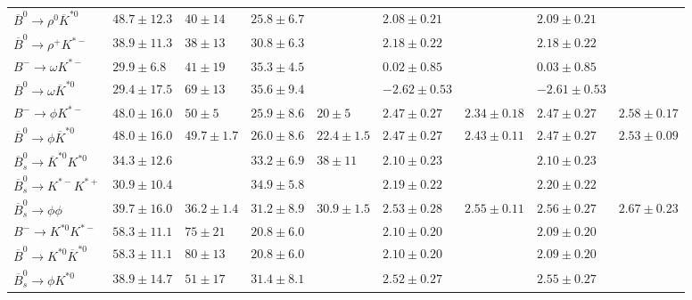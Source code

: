 \documentclass[11pt]{article}
\begin{document}
\begin{table}[tbh!]
\begin{center}
{\begin{tabular}{l| l |l|l| l|l| l|l| l }
$\overline B^0\to\rho^0\overline K^{*0}$    & $48.7\pm12.3$ & $40\pm14$   & $25.8\pm6.7$ &      & $2.08\pm0.21$ &      & $2.09\pm0.21$\\
$\overline B^0\to\rho^+ K^{*-}$             & $38.9\pm11.3$ & $38\pm13$   & $30.8\pm6.3$ &      & $2.18\pm0.22$ &     & $2.18\pm0.22$\\
$B^-\to\omega K^{*-}$                       & $29.9\pm6.8$ & $41\pm19$   & $35.3\pm4.5$ &      & $0.02\pm0.85$ &      & $0.03\pm0.85$\\
$\overline B^0\to\omega\overline K^{*0}$    & $29.4\pm17.5$ & $69\pm13$   & $35.6\pm9.4$ &     & $-2.62\pm0.53$ &      & $-2.61\pm0.53$
\\
$B^-\to \phi K^{*-}$                     & $48.0\pm16.0$ & $50\pm5$     & $25.9\pm8.6$ & $20\pm5$& $2.47\pm0.27$ & $2.34\pm0.18$ & $2.47\pm0.27$ &$2.58\pm0.17$\\
$\overline B^0\to \phi\overline K^{*0}$  & $48.0\pm16.0$ & $49.7\pm1.7$ & $26.0\pm8.6$ & $22.4\pm1.5$ & $2.47\pm0.27$ & $2.43\pm0.11$ & $2.47\pm0.27 $ &$2.53\pm0.09$\\
$\overline B_s^0\to \overline K^{*0} K^{*0}$ & $34.3\pm12.6$ &    & $33.2\pm6.9$  & $38\pm11$  & $2.10\pm0.23$ &  & $2.10\pm0.23$\\
$\overline B_s^0\to   K^{*-} K^{*+}$         & $30.9\pm10.4$  &    & $34.9\pm5.8$ &            & $2.19\pm0.22$&  & $2.20\pm0.22$\\
$\overline B_s^0\to \phi \phi$    & $39.7\pm16.0$  & $36.2\pm1.4$ & $31.2\pm8.9$ & $30.9\pm1.5$  &$2.53\pm0.28$ &$2.55\pm0.11$ &$2.56\pm0.27$ &$2.67\pm0.23$\\
 \hline
$B^-\to K^{*0} K^{*-}$                        & $58.3\pm11.1$ & $75\pm21$   & $20.8\pm6.0$ &     & $2.10\pm0.20$   &     & $2.09\pm0.20$\\
$\overline B^0\to K^{*0}\overline K^{*0}$     & $58.3\pm11.1$ & $80\pm13$   & $20.8\pm6.0$ &     & $2.10\pm0.20$    &     & $2.09\pm0.20$\\
$\overline B_s^0\to \phi K^{*0}$  & $38.9\pm14.7$  & $51\pm17$    & $31.4\pm8.1$ &               &$2.52\pm0.27$  &              & $2.55\pm0.27$& \\
\hline
\hline
\end{tabular}
}
\end{center}
\end{table}

\end{document}
